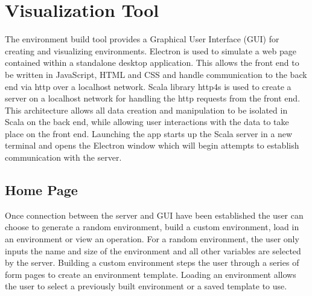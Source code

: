 \section{Visualization Tool}
The environment build tool provides a Graphical User Interface (GUI) for creating and visualizing environments.
Electron  is used to simulate a web page contained within a standalone desktop application.
This allows the front end to be written in JavaScript, HTML and CSS and handle communication to the back end via http over a localhost network.
Scala library http4s  is used to create a server on a localhost network for handling the http requests from the front end.
This architecture allows all data creation and manipulation to be isolated in Scala on the back end, while allowing user interactions with the data to take place on the front end.
Launching the app starts up the Scala server in a new terminal and opens the Electron window which will begin attempts to establish communication with the server.


\subsection{Home Page}
Once connection between the server and GUI have been established the user can choose to generate a random environment, build a custom environment, load in an environment or view an operation. 
For a random environment, the user only inputs the name and size of the environment and all other variables are selected by the server.
Building a custom environment steps the user through a series of form pages to create an environment template.
Loading an environment allows the user to select a previously built environment or a saved template to use.

